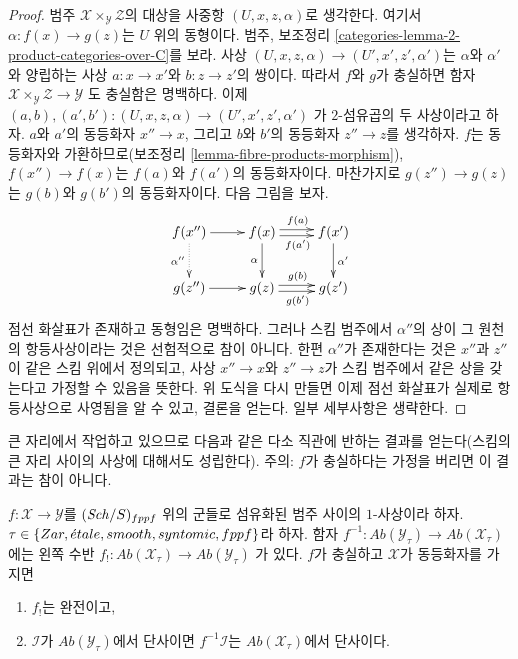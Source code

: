 \begin{proof}
범주 $\mathcal{X} \times_\mathcal{Y} \mathcal{Z}$의 대상을 사중항
$(U, x, z, \alpha)$로 생각한다. 여기서
$\alpha : f(x) \to g(z)$는 $U$ 위의 동형이다.
범주, 보조정리 \ref{categories-lemma-2-product-categories-over-C}를 보라.
사상 $(U, x, z, \alpha) \to (U', x', z', \alpha')$는
$\alpha$와 $\alpha'$와 양립하는 사상 $a : x \to x'$와
$b : z \to z'$의 쌍이다. 따라서 $f$와 $g$가 충실하면 함자
$\mathcal{X} \times_\mathcal{Y} \mathcal{Z} \to \mathcal{Y}$
도 충실함은 명백하다. 이제
$(a, b), (a', b') : (U, x, z, \alpha) \to (U', x', z', \alpha')$
가 $2$-섬유곱의 두 사상이라고 하자. $a$와 $a'$의 동등화자
$x'' \to x$, 그리고 $b$와 $b'$의 동등화자 $z'' \to z$를 생각하자.
$f$는 동등화자와 가환하므로(보조정리
\ref{lemma-fibre-products-morphism}),
$f(x'') \to f(x)$는 $f(a)$와 $f(a')$의 동등화자이다.
마찬가지로 $g(z'') \to g(z)$는 $g(b)$와 $g(b')$의 동등화자이다.
다음 그림을 보자.
$$
\xymatrix{
f(x'') \ar[r] \ar@{..>}[d]_{\alpha''}&
f(x) \ar[d]_\alpha
\ar@<0.5ex>[r]^{f(a)}
\ar@<-0.5ex>[r]_{f(a')}
 &
f(x') \ar[d]^{\alpha'} \\
g(z'') \ar[r] &
g(z)
\ar@<0.5ex>[r]^{g(b)}
\ar@<-0.5ex>[r]_{g(b')}
 &
g(z')
}
$$
점선 화살표가 존재하고 동형임은 명백하다.
그러나 스킴 범주에서 $\alpha''$의 상이 그 원천의 항등사상이라는
것은 선험적으로 참이 아니다. 한편 $\alpha''$가 존재한다는 것은
$x''$과 $z''$이 같은 스킴 위에서 정의되고, 사상
$x'' \to x$와 $z'' \to z$가 스킴 범주에서 같은 상을 갖는다고
가정할 수 있음을 뜻한다. 위 도식을 다시 만들면 이제 점선 화살표가
실제로 항등사상으로 사영됨을 알 수 있고, 결론을 얻는다.
일부 세부사항은 생략한다.
\end{proof}

\noindent
큰 자리에서 작업하고 있으므로 다음과 같은 다소 직관에 반하는 결과를
얻는다(스킴의 큰 자리 사이의 사상에 대해서도 성립한다).
주의: $f$가 충실하다는 가정을 버리면 이 결과는 참이 아니다.

\begin{lemma}
\label{lemma-pullback-injective}
$f : \mathcal{X} \to \mathcal{Y}$를 $(\mathit{Sch}/S)_{fppf}$ 위의
군들로 섬유화된 범주 사이의 $1$-사상이라 하자.
$\tau \in \{Zar, {\acute{e}tale}, smooth, syntomic, fppf\}$라 하자. 함자
$f^{-1} : \textit{Ab}(\mathcal{Y}_\tau) \to \textit{Ab}(\mathcal{X}_\tau)$
에는 왼쪽 수반
$f_! : \textit{Ab}(\mathcal{X}_\tau) \to \textit{Ab}(\mathcal{Y}_\tau)$
가 있다. $f$가 충실하고 $\mathcal{X}$가 동등화자를 가지면
\begin{enumerate}
\item $f_!$는 완전이고,
\item $\mathcal{I}$가 $\textit{Ab}(\mathcal{Y}_\tau)$에서 단사이면
$f^{-1}\mathcal{I}$는 $\textit{Ab}(\mathcal{X}_\tau)$에서 단사이다.
\end{enumerate}
\end{lemma}

